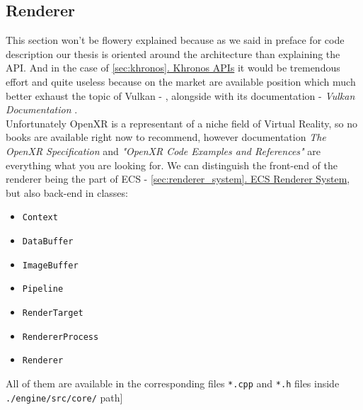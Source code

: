 \newpage
\subsection{Renderer}
This section won't be flowery explained because as we said in preface for code description our thesis is oriented around the architecture than explaining the API. And in the case of \hyperref[sec:khronos]{\ref*{sec:khronos}. Khronos APIs} it would be tremendous effort and quite useless because on the market are available position which much better exhaust the topic of Vulkan - \cite{VulkanCookbook}, alongside with its documentation - \textit{Vulkan Documentation} \cite{VkDoc}.\\ Unfortunately OpenXR is a representant of a niche field of Virtual Reality, so no books are available right now to recommend, however documentation \textit{The OpenXR Specification} \cite{XrDoc} and \textit{"OpenXR Code Examples and References"} \cite{OpenXrExamples} are everything what you are looking for. %
\label{sec:renderer}
We can distinguish the front-end of the renderer being the part of ECS - \hyperref[sec:renderer_system]{\ref*{sec:renderer_system}. ECS Renderer System}, but also back-end in classes:
\begin{itemize}
    \item \texttt{Context}
    \item \texttt{DataBuffer}
    \item \texttt{ImageBuffer}
    \item \texttt{Pipeline}
    \item \texttt{RenderTarget}
    \item \texttt{RendererProcess}
    \item \texttt{Renderer}
\end{itemize}
All of them are available in the corresponding files \texttt{*.cpp} and \texttt{*.h} files inside \texttt{./engine/src/core/} path]

